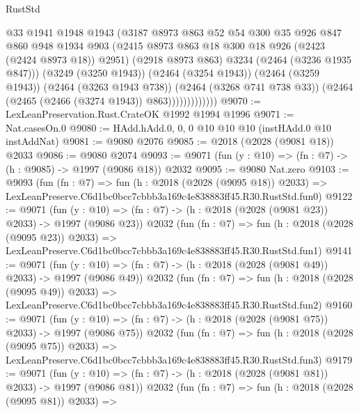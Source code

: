 \begin{lexlean}{RustStd}
\begin{coremodule}
                          @33
                          @1941
                          @1948
                          @1943
                          (@3187
                            @8973
                            @863
                            @52
                            @54
                            @300
                            @35
                            @926
                            @847
                            @860
                            @948
                            @1934
                            @903
                            (@2415 @8973 @863 @18 @300 @18 @926 (@2423 (@2424 @8973 @18)) @2951)
                            (@2918 @8973 @863)
                            @3234
                            (@2464 (@3236 @1935 @847)))
                          (@3249 (@3250 @1943))
                          (@2464 (@3254 @1943))
                          (@2464 (@3259 @1943))
                          (@2464 (@3263 @1943 @738))
                          (@2464 (@3268 @741 @738 @33))
                          (@2464 (@2465 (@2466 (@3274 @1943)) @863)))))))))))))
@9070 := LexLeanPreservation.Rust.CrateOK @1992 @1994 @1996
@9071 := Nat.casesOn.{0}
@9080 := HAdd.hAdd.{0, 0, 0} @10 @10 @10 (instHAdd.{0} @10 instAddNat)
@9081 := @9080 @2076
@9085 := @2018 (@2028 (@9081 @18)) @2033
@9086 := @9080 @2074
@9093 := @9071 (fun (y : @10) => (fn : @7) -> (h : @9085) -> @1997 (@9086 @18)) @2032
@9095 := @9080 Nat.zero
@9103 := @9093
    (fun (fn : @7) =>
    fun (h : @2018 (@2028 (@9095 @18)) @2033) =>
    LexLeanPreserve.C6d1bc0bcc7cbbb3a169c4e838883ff45.R30.RustStd.fun0)
@9122 := @9071
    (fun (y : @10) => (fn : @7) -> (h : @2018 (@2028 (@9081 @23)) @2033) -> @1997 (@9086 @23))
    @2032
    (fun (fn : @7) =>
    fun (h : @2018 (@2028 (@9095 @23)) @2033) =>
    LexLeanPreserve.C6d1bc0bcc7cbbb3a169c4e838883ff45.R30.RustStd.fun1)
@9141 := @9071
    (fun (y : @10) => (fn : @7) -> (h : @2018 (@2028 (@9081 @49)) @2033) -> @1997 (@9086 @49))
    @2032
    (fun (fn : @7) =>
    fun (h : @2018 (@2028 (@9095 @49)) @2033) =>
    LexLeanPreserve.C6d1bc0bcc7cbbb3a169c4e838883ff45.R30.RustStd.fun2)
@9160 := @9071
    (fun (y : @10) => (fn : @7) -> (h : @2018 (@2028 (@9081 @75)) @2033) -> @1997 (@9086 @75))
    @2032
    (fun (fn : @7) =>
    fun (h : @2018 (@2028 (@9095 @75)) @2033) =>
    LexLeanPreserve.C6d1bc0bcc7cbbb3a169c4e838883ff45.R30.RustStd.fun3)
@9179 := @9071
    (fun (y : @10) => (fn : @7) -> (h : @2018 (@2028 (@9081 @81)) @2033) -> @1997 (@9086 @81))
    @2032
    (fun (fn : @7) =>
    fun (h : @2018 (@2028 (@9095 @81)) @2033) =>

\end{coremodule}
\end{lexlean}
